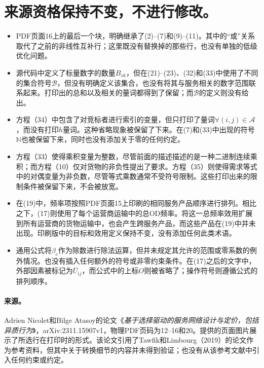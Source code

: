 \documentclass{article}
\begin{document}
\section*{来源资格保持不变，不进行修改。}
\begin{itemize}
\item PDF页面16上的最后一个块，明确继承了(2)--(7)和(9)--(11)。其中的“或”关系取代了之前的非线性互补行；这里既没有替换掉的那些行，也没有单独的低级优化问题。
\item 源代码中定义了标量数字的数量\(B_{sk}\)，但在(21)--(23)、(32)和(33)中使用了不同的集合符号\(\mathcal B\)，但没有明确定义该集合，也没有将其与服务相关的数字范围联系起来。打印出的总和以及相关的量词都得到了保留；而\(\mathcal B\)的定义则没有给出。
\item 方程（34）中包含了对竞标者进行索引的变量，但只打印了量词\(\forall(i,j)\in\mathcal A\)，而没有打印\(h\)量词。这种省略现象被保留了下来。在(7)和(33)中出现的符号\(\mathbb N\)也被保留下来，同时也没有添加关于零的任何约定。
\item 方程（33）使得乘积变量为整数，尽管前面的描述描述的是一种二进制连续乘积；而方程（10）仅对货物的非负性提出了要求。方程（35）则使得需求等式中的对偶变量为非负数，尽管等式乘数通常不受符号限制。这些打印出来的限制条件被保留下来，不会被放宽。
\item 在(19)中，频率项按照PDF页面15上印刷的相同服务产品顺序进行排列。相比之下，(17)则使用了每个运营商运输中的总OD频率。将这一总频率效用扩展到所有运营商的货物运输中，也会产生跨服务产品，而这些产品在(19)中并未出现。印刷版中的目标和效用定义保持不变，没有添加任何此类术语。
\item 通用公式将\(\beta_c\)作为除数进行除法运算，但并未规定其允许的范围或零系数的例外情况。也没有插入任何额外的符号或非零约束条件。在(17)之后的文字中，外部因素被标记为\(\bar U_{ij}\)，而公式中的上标\(O\)则被省略了；操作符号则遵循公式的排列顺序。
\end{itemize}

\paragraph{来源。}
Adrien Nicolet和Bilge Atasoy的论文《\emph{基于选择驱动的服务网络设计与定价，包括异质行为}》，arXiv:2311.15907v1，物理PDF页码为12–16和20。提供的页面图片展示了所选行在打印时的形式。该论文引用了Tawfik和Limbourg（2019）的论文作为参考资料，但其中关于转换细节的内容并未得到验证；也没有从该参考文献中引入任何约束或约定。
\end{document}
